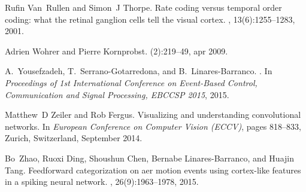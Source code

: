 \documentclass[preprint,5p,12pt,twocolumn]{article}
\begin{document}
\begin{thebibliography}{10}
Rufin Van~Rullen and Simon~J Thorpe.
\newblock Rate coding versus temporal order coding: what the retinal ganglion
  cells tell the visual cortex.
, 13(6):1255--1283, 2001.

Adrien Wohrer and Pierre Kornprobst.
(2):219--49, apr 2009.

A.~Yousefzadeh, T.~Serrano-Gotarredona, and B.~Linares-Barranco.
.
\newblock In {\em Proceedings of 1st International Conference on Event-Based
  Control, Communication and Signal Processing, EBCCSP 2015}, 2015.

Matthew~D Zeiler and Rob Fergus.
\newblock Visualizing and understanding convolutional networks.
\newblock In {\em European Conference on Computer Vision (ECCV)}, pages
  818--833, Zurich, Switzerland, September 2014.

Bo~Zhao, Ruoxi Ding, Shoushun Chen, Bernabe Linares-Barranco, and Huajin Tang.
\newblock Feedforward categorization on aer motion events using cortex-like
  features in a spiking neural network.
,
  26(9):1963--1978, 2015.

\end{thebibliography}






\end{document}
